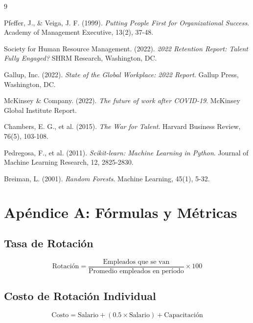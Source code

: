 \documentclass[11pt,a4paper,twoside]{article}
\begin{document}
\begin{thebibliography}{9}

Pfeffer, J., \& Veiga, J. F. (1999).
\textit{Putting People First for Organizational Success}.
Academy of Management Executive, 13(2), 37-48.

Society for Human Resource Management. (2022).
\textit{2022 Retention Report: Talent Fully Engaged?}
SHRM Research, Washington, DC.

Gallup, Inc. (2022).
\textit{State of the Global Workplace: 2022 Report}.
Gallup Press, Washington, DC.

McKinsey \& Company. (2022).
\textit{The future of work after COVID-19}.
McKinsey Global Institute Report.

Chambers, E. G., et al. (2015).
\textit{The War for Talent}.
Harvard Business Review, 76(5), 103-108.

Pedregosa, F., et al. (2011).
\textit{Scikit-learn: Machine Learning in Python}.
Journal of Machine Learning Research, 12, 2825-2830.

Breiman, L. (2001).
\textit{Random Forests}.
Machine Learning, 45(1), 5-32.

\end{thebibliography}

\newpage
\section*{Apéndice A: Fórmulas y Métricas}

\subsection*{Tasa de Rotación}
\[
\text{Rotación} = \frac{\text{Empleados que se van}}{\text{Promedio empleados en período}} \times 100
\]

\subsection*{Costo de Rotación Individual}
\[
\text{Costo} = \text{Salario} + (0.5 \times \text{Salario}) + \text{Capacitación}
\]
\end{document}
